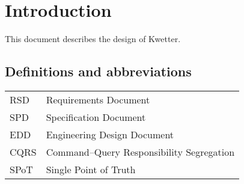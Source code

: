 \chapter{Introduction}
This document describes the design of Kwetter.

\section{Definitions and abbreviations}

\begin{tabularx}{\textwidth}{lX}
    RSD & Requirements Document\\
    SPD & Specification Document\\
    EDD & Engineering Design Document\\
    CQRS & Command–Query Responsibility Segregation\\
    SPoT & Single Point of Truth\\
\end{tabularx}